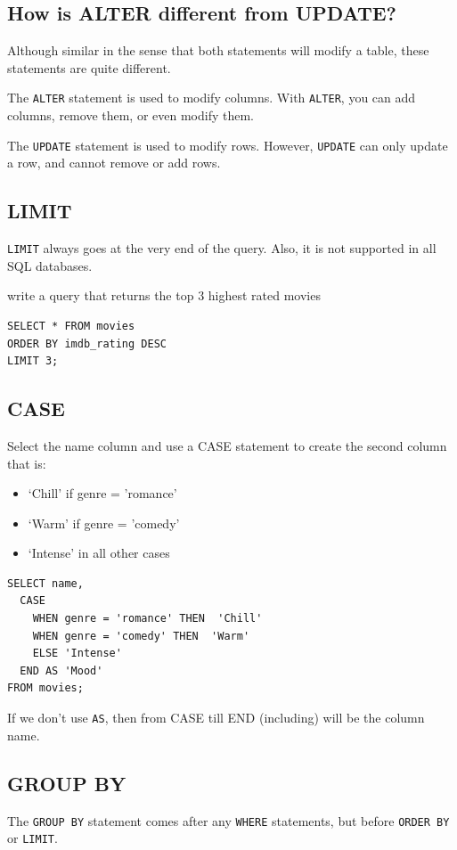 \documentclass[a4paper, 12pt]{article}
\begin{document}
\subsection{How is ALTER different from UPDATE?}
Although similar in the sense that both statements will modify a table, these statements are quite different.

The \verb|ALTER| statement is used to modify columns. With \verb|ALTER|, you can add columns, remove them, or even modify them.

The \verb|UPDATE| statement is used to modify rows. However, \verb|UPDATE| can only update a row, and cannot remove or add rows.

\subsection{LIMIT}
\verb|LIMIT| always goes at the very end of the query. Also, it is not supported in all SQL databases.

write a query that returns the top 3 highest rated movies
\begin{verbatim}
SELECT * FROM movies
ORDER BY imdb_rating DESC
LIMIT 3;
\end{verbatim}

\subsection{CASE}
Select the name column and use a CASE statement to create the second column that is:
\begin{itemize}
\item ‘Chill’ if genre = 'romance'

\item ‘Warm’ if genre = 'comedy'

\item ‘Intense’ in all other cases

\end{itemize}
\begin{verbatim}
SELECT name,
  CASE
    WHEN genre = 'romance' THEN  'Chill'
    WHEN genre = 'comedy' THEN  'Warm'
    ELSE 'Intense'
  END AS 'Mood'
FROM movies;
\end{verbatim}
If we don't use \verb|AS|, then from CASE till END (including) will be the column name.

\subsection{GROUP BY}
The \verb|GROUP BY| statement comes after any \verb|WHERE| statements, but before \verb|ORDER BY| or \verb|LIMIT|.
\end{document}
